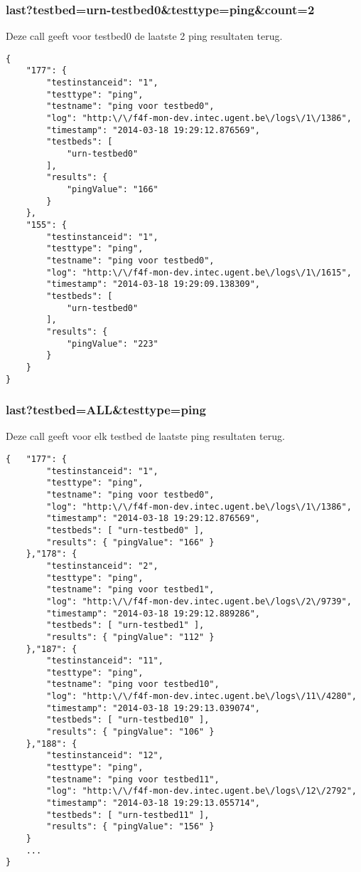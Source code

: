 \subsubsection{last?testbed=urn-testbed0\&testtype=ping\&count=2}
Deze call geeft voor testbed0 de laatste 2 ping resultaten terug.
\begin{verbatim}
{
    "177": {
        "testinstanceid": "1",
        "testtype": "ping",
        "testname": "ping voor testbed0",
        "log": "http:\/\/f4f-mon-dev.intec.ugent.be\/logs\/1\/1386",
        "timestamp": "2014-03-18 19:29:12.876569",
        "testbeds": [
            "urn-testbed0"
        ],
        "results": {
            "pingValue": "166"
        }
    },
    "155": {
        "testinstanceid": "1",
        "testtype": "ping",
        "testname": "ping voor testbed0",
        "log": "http:\/\/f4f-mon-dev.intec.ugent.be\/logs\/1\/1615",
        "timestamp": "2014-03-18 19:29:09.138309",
        "testbeds": [
            "urn-testbed0"
        ],
        "results": {
            "pingValue": "223"
        }
    }
}
\end{verbatim}

\clearpage
\subsubsection{last?testbed=ALL\&testtype=ping}
Deze call geeft voor elk testbed de laatste ping resultaten terug.
\begin{verbatim}
{   "177": {
        "testinstanceid": "1",
        "testtype": "ping",
        "testname": "ping voor testbed0",
        "log": "http:\/\/f4f-mon-dev.intec.ugent.be\/logs\/1\/1386",
        "timestamp": "2014-03-18 19:29:12.876569",
        "testbeds": [ "urn-testbed0" ],
        "results": { "pingValue": "166" }
    },"178": {
        "testinstanceid": "2",
        "testtype": "ping",
        "testname": "ping voor testbed1",
        "log": "http:\/\/f4f-mon-dev.intec.ugent.be\/logs\/2\/9739",
        "timestamp": "2014-03-18 19:29:12.889286",
        "testbeds": [ "urn-testbed1" ],
        "results": { "pingValue": "112" }
    },"187": {
        "testinstanceid": "11",
        "testtype": "ping",
        "testname": "ping voor testbed10",
        "log": "http:\/\/f4f-mon-dev.intec.ugent.be\/logs\/11\/4280",
        "timestamp": "2014-03-18 19:29:13.039074",
        "testbeds": [ "urn-testbed10" ],
        "results": { "pingValue": "106" }
    },"188": {
        "testinstanceid": "12",
        "testtype": "ping",
        "testname": "ping voor testbed11",
        "log": "http:\/\/f4f-mon-dev.intec.ugent.be\/logs\/12\/2792",
        "timestamp": "2014-03-18 19:29:13.055714",
        "testbeds": [ "urn-testbed11" ],
        "results": { "pingValue": "156" }
    }
    ...
}
\end{verbatim}

